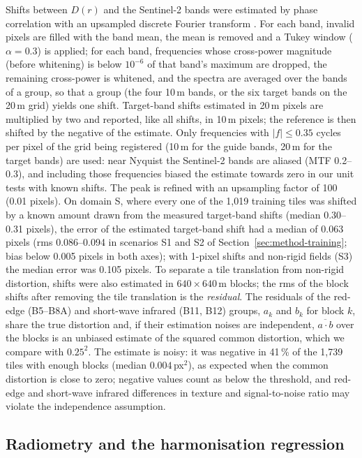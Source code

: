 \documentclass[pdflatex,sn-basic,referee,lineno]{sn-jnl}
\begin{document}
Shifts between $D(r)$ and the Sentinel-2 bands were estimated by phase correlation with an upsampled discrete
Fourier transform \citep{guizar2008registration}. For each band, invalid pixels are filled with the band mean, the
mean is removed and a Tukey window ($\alpha=0.3$) is applied; for each band, frequencies whose cross-power
magnitude (before whitening) is below $10^{-6}$ of that band's maximum are dropped, the remaining cross-power is
whitened, and the spectra are averaged over the bands of a group, so that a
group (the four 10\,m bands, or the six target bands on the 20\,m grid) yields one shift. Target-band shifts
estimated in 20\,m pixels are multiplied by two and reported, like all shifts, in 10\,m pixels; the reference is
then shifted by the negative of the estimate. Only frequencies with
$|f|\le0.35$ cycles per pixel of the grid being registered (10\,m for the guide bands, 20\,m for the target bands)
are used: near Nyquist the Sentinel-2 bands are aliased (MTF 0.2--0.3), and including
those frequencies biased the estimate towards zero in our unit tests with known shifts. The peak is refined with an upsampling factor of 100 (0.01 pixels). On domain S, where every one of the 1,019
training tiles was shifted by a known amount drawn from the measured target-band shifts (median 0.30--0.31 pixels), the
error of the estimated target-band shift had a median of 0.063 pixels (rms 0.086--0.094 in scenarios S1 and S2 of
Section~\ref{sec:method-training};
bias below 0.005 pixels in both axes); with 1-pixel shifts and non-rigid fields (S3) the median error was 0.105
pixels. To separate a tile translation from non-rigid distortion, shifts were also
estimated in $640\times640$\,m blocks; the rms of the block shifts after removing the tile translation is the
\emph{residual}. The residuals of the red-edge (B5--B8A) and short-wave infrared (B11, B12) groups, $a_k$ and $b_k$
for block $k$, share the true distortion and, if their estimation noises are independent, $\overline{a\cdot b}$ over the blocks
is an unbiased estimate of the squared common distortion, which we compare with $0.25^2$. The estimate is noisy:
it was negative in 41\,\% of the 1,739 tiles with enough blocks (median $0.004$\,px$^2$), as expected when the
common distortion is close to zero; negative values count as below the threshold, and red-edge and short-wave
infrared differences in texture and signal-to-noise ratio may violate the independence assumption.

\subsection{Radiometry and the harmonisation regression}\label{sec:mechanism}
\end{document}
